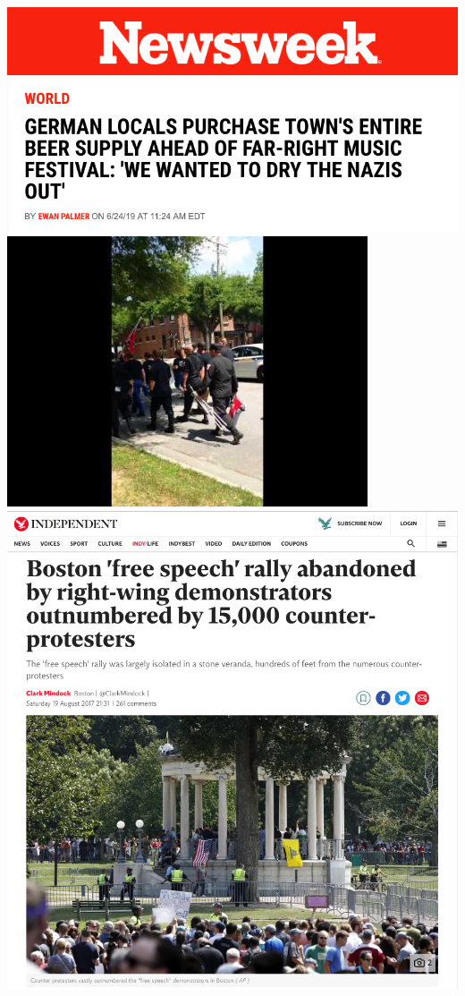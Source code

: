 \documentclass[nobackground,dvipsnames,table]{beamer}
\begin{document}
\begin{frame}{}
    \begin{columns}
            \centering
            \includegraphics[width=\textwidth]{newsweek}
            \includegraphics[width=\textwidth]{newsweek-article}
            \href{https://youtu.be/Rs4P1kKK-5k}{\includegraphics[width=0.8\textwidth]{kkk-marchers-video}}
            \includegraphics[width=\textwidth]{rally-abandoned-counterprotests}

\end{columns}
\end{frame}
\end{document}
